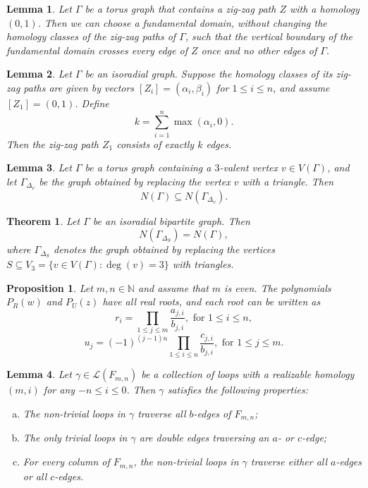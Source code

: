 \documentclass[10pt,a4paper]{amsart}
\newtheorem{lem}{Lemma}
\newtheorem{thm}{Theorem}
\newtheorem{prop}{Proposition}
\begin{document}
\begin{lem} \label{vertical zig-zag path}
    Let $\Gamma$ be a torus graph that contains a zig-zag path $Z$ with a homology $(0,1)$. Then we can choose a fundamental domain, without changing the homology classes of the zig-zag paths of $\Gamma$, such that the vertical boundary of the fundamental domain crosses every edge of $Z$ once and no other edges of $\Gamma$. 
\end{lem}

\begin{lem} \label{fundamental_domain matching}
    Let $\Gamma$ be an isoradial graph.  
    Suppose the homology classes of its zig-zag paths are given by vectors $[Z_i] = (\alpha_i, \beta_i)$ for $1 \leq i \leq n$, and assume $[Z_1] = (0,1)$. Define \[k = \sum_{i=1}^n \max(\alpha_i,0).\] 
    Then the zig-zag path $Z_1$ consists of exactly $k$ edges.
\end{lem}

\begin{lem} \label{N(Gamma) < N(Gamma_Delta_v)}
    Let $\Gamma$ be a torus graph containing a $3$-valent vertex $v \in V(\Gamma)$, and let $\Gamma_{\Delta_v}$ be the graph obtained by replacing the vertex $v$ with a triangle. Then
    \[N(\Gamma)\subseteq N(\Gamma_{\Delta_v}).\]
\end{lem}

\begin{thm} \label{equal newton polygons delta}
    Let $\Gamma$ be an isoradial bipartite graph. Then
    \[N(\Gamma_{\Delta_{S}}) = N(\Gamma),\]
    where $\Gamma_{\Delta_{S}}$ denotes the graph obtained by replacing the vertices $S \subseteq V_3 = \{v \in V(\Gamma): \deg(v) = 3\}$ with triangles.
\end{thm}

\begin{prop} \label{rootsT}
    Let $m,n \in \mathbb{N}$ and assume that $m$ is even. The polynomials $P_R(w)$ and $P_U(z)$ have all real roots, and each root can be written as 
    \[r_i = \prod_{1 \leq j \leq m} \frac{a_{j,i}}{b_{j,i}}, \text{ for } 1 \leq i \leq n,\]
    \[u_j = (-1)^{(j-1)n} \prod_{1 \leq i \leq n} \frac{c_{j,i}}{b_{j,i}} ,\text{ for } 1 \leq j \leq m.\]
\end{prop}

\begin{lem} \label{no double edges}
    Let $\gamma \in \mathcal{L}(F_{m,n})$ be a collection of loops with a realizable homology $(m,i)$ for any $-n \leq i \leq 0$. Then $\gamma$ satisfies the following properties:
    \begin{enumerate} [(a)]
        \item The non-trivial loops in $\gamma$ traverse all $b$-edges of $F_{m,n}$;
        \item The only trivial loops in $\gamma$ are double edges traversing an $a$- or $c$-edge;
        \item For every column of $F_{m,n}$, the non-trivial loops in $\gamma$ traverse either all $a$-edges or all $c$-edges.
    \end{enumerate}
\end{lem}
\end{document}

